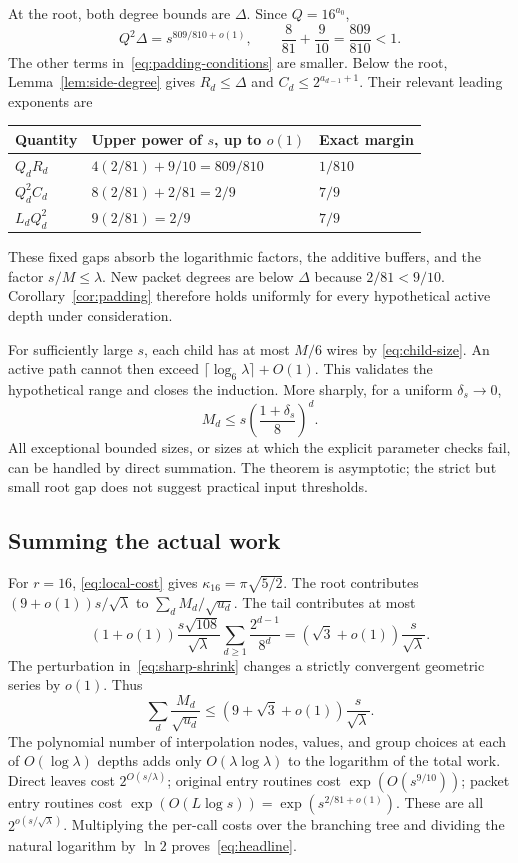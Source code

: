 \documentclass[11pt,letterpaper]{article}
\theoremstyle{remark}\newtheorem{remark}[theorem]{Remark}
\begin{document}
At the root, both degree bounds are $\Delta$. Since $Q=16^{a_0}$,
\[
 Q^2\Delta=s^{809/810+o(1)},
 \qquad \frac8{81}+\frac9{10}=\frac{809}{810}<1.
\]
The other terms in~\eqref{eq:padding-conditions} are smaller. Below the
root, Lemma~\ref{lem:side-degree} gives $R_d\le\Delta$ and
$C_d\le2^{a_{d-1}+1}$. Their relevant leading exponents are
\begin{center}
\begin{tabular}{@{}lll@{}}
\toprule
Quantity & Upper power of $s$, up to $o(1)$ & Exact margin\\
\midrule
$Q_dR_d$ & $4(2/81)+9/10=809/810$ & $1/810$\\
$Q_d^2C_d$ & $8(2/81)+2/81=2/9$ & $7/9$\\
$L_dQ_d^2$ & $9(2/81)=2/9$ & $7/9$\\
\bottomrule
\end{tabular}
\end{center}
These fixed gaps absorb the logarithmic factors, the additive buffers,
and the factor $s/M\le\lambda$. New packet degrees are below $\Delta$
because $2/81<9/10$. Corollary~\ref{cor:padding} therefore holds
uniformly for every hypothetical active depth under consideration.

For sufficiently large $s$, each child has at most $M/6$ wires by
\eqref{eq:child-size}. An active path cannot then exceed
$\lceil\log_6\lambda\rceil+O(1)$. This validates the hypothetical range
and closes the induction. More sharply, for a uniform $\delta_s\to0$,
\begin{equation}\label{eq:sharp-shrink}
 M_d\le s\left(\frac{1+\delta_s}{8}\right)^d.
\end{equation}
All exceptional bounded sizes, or sizes at which the explicit parameter
checks fail, can be handled by direct summation. The theorem is
asymptotic; the strict but small root gap does not suggest practical
input thresholds.

\subsection{Summing the actual work}
For $r=16$, \eqref{eq:local-cost} gives
$\kappa_{16}=\pi\sqrt{5/2}$. The root contributes
$(9+o(1))s/\sqrt\lambda$ to $\sum_dM_d/\sqrt{u_d}$.
The tail contributes at most
\[
 (1+o(1))\frac{s\sqrt{108}}{\sqrt\lambda}
 \sum_{d\ge1}\frac{2^{d-1}}{8^d}
 =\left(\sqrt3+o(1)\right)\frac{s}{\sqrt\lambda}.
\]
The perturbation in~\eqref{eq:sharp-shrink} changes a strictly convergent
geometric series by $o(1)$. Thus
\begin{equation}\label{eq:path-sum}
 \sum_d\frac{M_d}{\sqrt{u_d}}
 \le(9+\sqrt3+o(1))\frac{s}{\sqrt\lambda}.
\end{equation}
The polynomial number of interpolation nodes, values, and group choices
at each of $O(\log\lambda)$ depths adds only
$O(\lambda\log\lambda)$ to the logarithm of the total work.
Direct leaves cost $2^{O(s/\lambda)}$; original entry routines cost
$\exp(O(s^{9/10}))$; packet entry routines cost
$\exp(O(L\log s))=\exp(s^{2/81+o(1)})$.
These are all $2^{o(s/\sqrt\lambda)}$.
Multiplying the per-call costs over the branching tree and dividing the
natural logarithm by $\ln2$ proves~\eqref{eq:headline}.
\end{document}
